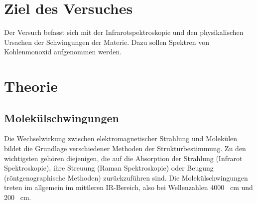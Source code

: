 \documentclass{article}
\begin{document}
\section{Ziel des Versuches}
Der Versuch befasst sich mit der Infrarotspektroskopie und den physikalischen Ursachen der Schwingungen der Materie.
Dazu sollen Spektren von Kohlenmonoxid aufgenommen werden.
\section {Theorie\supercite{fadini}}
\subsection{Molekülschwingungen}
Die Wechselwirkung zwischen elektromagnetischer Strahlung und Molekülen
bildet die Grundlage verschiedener Methoden der Strukturbestimmung. Zu den wichtigsten
gehören diejenigen, die auf die Absorption der Strahlung (Infrarot Spektroskopie),
ihre Streuung (Raman Spektroskopie) oder Beugung (röntgenographische Methoden)
zurückzuführen sind.
Die Molekülschwingungen treten im allgemein im mittleren IR-Bereich,
also bei Wellenzahlen 4000 \si{\per\centi\meter} und 200 \si{\per\centi\meter}.
\end{document}
